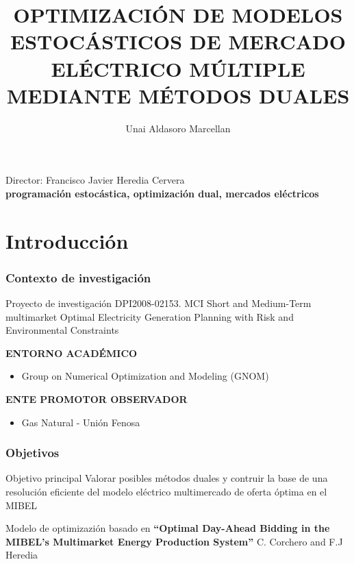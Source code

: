 \documentclass[xcolor=dvipsnames, utf8, spanish]{beamer} %
\title [Problema multimercado de oferta óptima]{OPTIMIZACIÓN DE MODELOS ESTOCÁSTICOS DE MERCADO ELÉCTRICO MÚLTIPLE MEDIANTE MÉTODOS DUALES}
\author[Unai Aldasoro Marcellan]{Unai Aldasoro Marcellan}
\institute{TFM - MIEIO curso 2010/2011}
\begin{document}
\newenvironment{specialframe}{\begin{frame}[fragile,environment=specialframe]}{\end{frame}}



\begin{frame}[plain]
	\titlepage
	\begin{center}
		Director: Francisco Javier Heredia Cervera \\
		\textbf{programación estocástica, optimización dual, mercados eléctricos}
	\end{center}
\end{frame}



\section{Introducción}

\begin{frame}
	\frametitle{Contexto de investigación}
	\begin{exampleblock} {Proyecto de investigación DPI2008-02153. MCI}
		Short and Medium-Term multimarket Optimal Electricity Generation Planning with Risk and Environmental Constraints
	\end{exampleblock}
	\bigskip  
	\textbf{ENTORNO ACADÉMICO}
	\begin{itemize}
		\item Group on Numerical Optimization and Modeling (GNOM)
	\end{itemize}
	\bigskip
	\textbf{ENTE PROMOTOR OBSERVADOR}
	\begin{itemize}
		\item Gas Natural - Unión Fenosa
	\end{itemize}
\end{frame}


\begin{frame}
	\frametitle{Objetivos}
	\begin{exampleblock} {Objetivo principal}
		Valorar posibles métodos duales y contruir la base de una resolución eficiente del modelo eléctrico multimercado de oferta óptima en el MIBEL
	\end{exampleblock}
	\bigskip
	Modelo de optimizazión basado en \textbf{``Optimal Day-Ahead Bidding in the MIBEL's Multimarket Energy Production System''} C. Corchero and F.J Heredia
\end{frame}
\end{document}
